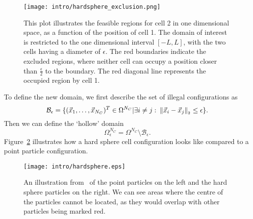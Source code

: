 \begin{figure}[h!]
	\centering
	\texttt{[image: intro/hardsphere\_exclusion.png]}
	\caption{This plot illustrates the feasible regions for cell 2 in one dimensional space, as a function of the position of cell 1. 
	The domain of interest is restricted to the one dimensional interval $[-L, L]$, with the two cells having a diameter of $\epsilon$. 
	The red boundaries indicate the excluded regions, where neither cell can occupy a position closer than $\frac{\epsilon}{2}$ to the boundary. 
	The red diagonal line represents the occupied region by cell 1.
	}
	\label{fig:exclusion1d}
\end{figure}

To define the new domain, we first describe the set of illegal configurations as
\[
	\mathcal{B}_{\epsilon} = \{(\vec{x}_1, \ldots, \vec{x}_{N_C})^T \in \Omega^{N_C} | \exists i \neq j: \: \norm[\vec{x}_i - \vec{x}_j] \leq \epsilon\}.
\]
Then we can define the `hollow' domain 
\[
	\Omega_{\epsilon}^{N_C} = \Omega^{N_C} \setminus \mathcal{B}_{\epsilon}.
\]
Figure~\ref{fig:hardsphere} illustrates how a hard sphere cell configuration looks like compared to a point particle configuration. \\



\begin{figure}[h!]
	\centering
	\texttt{[image: intro/hardsphere.eps]}
	\caption{An illustration from~\cite{Bruna2012} of the point particles on the left and the hard sphere particles on the right. We can see areas where the centre of the particles cannot be located, as they would overlap with other particles being marked red. 
	}
	\label{fig:hardsphere}
\end{figure}

